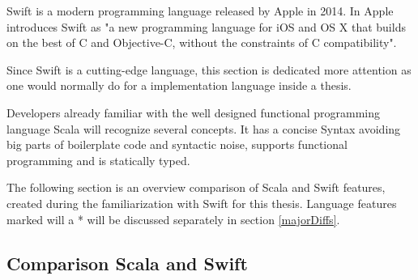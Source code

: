 Swift is a modern programming language released by Apple in 2014. In \cite{swift-book} Apple introduces Swift as "a new programming language for iOS and OS X that builds on the best of C and Objective-C, without the constraints of C compatibility".

Since Swift is a cutting-edge language, this section is dedicated more attention as one would normally do for a implementation language inside a thesis. 

Developers already familiar with the well designed functional programming language Scala will recognize several concepts. It has a concise Syntax avoiding big parts of boilerplate code and syntactic noise, supports functional programming and is statically typed.

The following section is an overview comparison of Scala and Swift features, created during the familiarization with Swift for this thesis. Language features marked will a * will be discussed separately in section \ref{majorDiffs}.

\subsection{Comparison Scala and Swift}

\newcommand{\yes}{yes}

